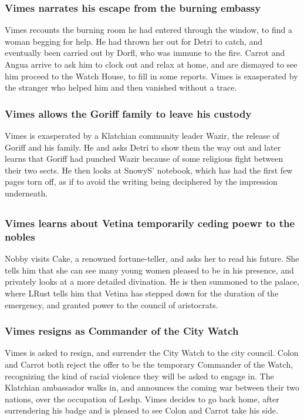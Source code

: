 \subsubsection{\Gls{Vimes} narrates his escape from the burning embassy}
\Gls{Vimes} recounts the burning room he had entered through the window, to find a woman begging
for help. He had thrown her out for \Gls{Detri} to catch, and eventually been carried out by
\Gls{Dorfl}, who was immune to the fire. \Gls{Carrot} and \Gls{Angua} arrive to ask him to clock out
and relax at home, and are dismayed to see him proceed to the Watch House, to fill in some reports.
\Gls{Vimes} is exasperated by the stranger who helped him and then vanished without a trace.

\subsubsection{\Gls{Vimes} allows the \Gls{Goriff} family to leave his custody}
\Gls{Vimes} is exasperated by a Klatchian community leader \Gls{Wazir}, the release of \Gls{Goriff}
and his family. He and asks \Gls{Detri} to show them the way out and later learns that \Gls{Goriff}
had punched \Gls{Wazir} because of some religious fight between their two sects. He then looks at
\Gls{SnowyS}' notebook, which has had the first few pages torn off, as if to avoid the writing
being deciphered by the impression underneath.

\subsection{}
\subsubsection{\Gls{Vimes} learns about \Gls{Vetina} temporarily ceding poewr to the nobles}
\Gls{Nobby} visits \Gls{Cake}, a renowned fortune-teller, and asks her to read his future. She tells
him that she can see many young women pleased to be in his presence, and privately looks at a more
detailed divination. He is then summoned to the palace, where \Gls{LRust} tells him that
\Gls{Vetina} has stepped down for the duration of the emergency, and granted power to the council of
aristocrats.

\subsubsection{\Gls{Vimes} resigns as Commander of the City Watch}
\Gls{Vimes} is asked to resign, and surrender the City Watch to the city council. \Gls{Colon} and
\Gls{Carrot} both reject the offer to be the temporary Commander of the Watch, recognizing the kind
of racial violence they will be asked to engage in. The Klatchian ambassador walks in, and announces
the coming war between their two nations, over the occupation of Leshp. \Gls{Vimes} decides to go
back home, after surrendering his badge and is pleased to see \Gls{Colon} and \Gls{Carrot} take his
side.

